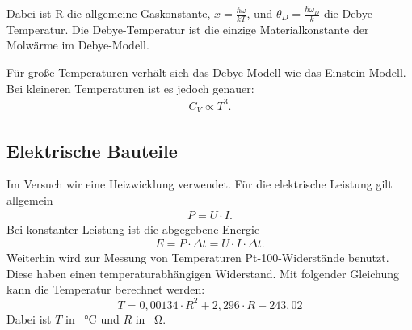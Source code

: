 Dabei ist R die allgemeine Gaskonstante, $x = \frac{\hbar \omega}{kT}$, und $\theta_D = \frac{\hbar \omega_D}{k}$ die Debye-Temperatur.
Die Debye-Temperatur ist die einzige Materialkonstante der Molwärme im Debye-Modell.

Für große Temperaturen verhält sich das Debye-Modell wie das Einstein-Modell.
Bei kleineren Temperaturen ist es jedoch genauer:
\begin{align}
	C_V \propto T^3.
\end{align}

\subsection{Elektrische Bauteile}
Im Versuch wir eine Heizwicklung verwendet.
Für die elektrische Leistung gilt allgemein
\begin{align}
	P = U \cdot I.
\end{align}
Bei konstanter Leistung ist die abgegebene Energie
\begin{align}
	\label{eenergie}
	E = P \cdot \Delta t = U \cdot I \cdot \Delta t.
\end{align}
Weiterhin wird zur Messung von Temperaturen Pt-100-Widerstände benutzt.
Diese haben einen temperaturabhängigen Widerstand.
Mit folgender Gleichung\cite{v47} kann die Temperatur berechnet werden:
\begin{equation}
	\label{pt100}
	T=0,00134\cdot R^2+2,296\cdot R-243,02
\end{equation}
Dabei ist $T$ in \SI{}{\celsius} und $R$ in \SI{}{\ohm}.